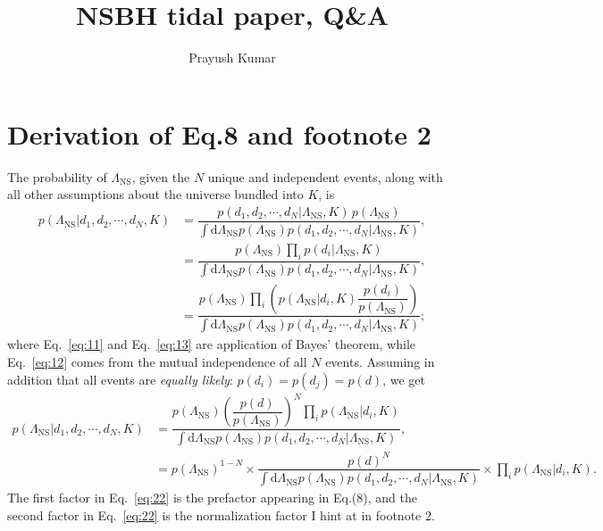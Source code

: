 \documentclass[aps,prd,amsmath,floats,floatfix,onecolumn,superscriptaddress,nofootinbib,showpacs]{revtex4-1}
\newcommand{\D}{\mathrm{d}}
\newcommand{\lambdans}{\Lambda_\mathrm{NS}}
\begin{document}
\title{NSBH tidal paper, Q\&A}
\author{Prayush Kumar}

\maketitle


\section{Derivation of Eq.8 and footnote 2}
The probability of $\lambdans$, given the $N$ unique and independent events,
along with all other assumptions about the universe bundled into $K$, is
\begin{eqnarray}
 p(\lambdans |d_1, d_2, \cdots, d_N, K) &= \dfrac{p(d_1,d_2,\cdots,d_N |\lambdans , K)\,p(\lambdans)}{\int\D\lambdans p(\lambdans ) p(d_1,d_2,\cdots,d_N |\lambdans , K)},\label{eq:11}\\
  &= \dfrac{p(\lambdans) \prod_{i} p(d_i|\lambdans, K)}{\int\D\lambdans p(\lambdans ) p(d_1,d_2,\cdots,d_N |\lambdans , K)},\label{eq:12}\\
  &= \dfrac{p(\lambdans) \prod_{i} \left( p(\lambdans |d_i, K)\dfrac{p(d_i)}{p(\lambdans)} \right)}{\int\D\lambdans p(\lambdans ) p(d_1,d_2,\cdots,d_N |\lambdans , K)}\label{eq:13};
\end{eqnarray}
where Eq.~\ref{eq:11} and Eq.~\ref{eq:13} are application of Bayes' theorem,
while Eq.~\ref{eq:12} comes from the mutual independence of all $N$ events. 
Assuming in addition that all events are {\it equally likely}: 
$p(d_i) = p(d_j) = p(d)$, we get
\begin{eqnarray}
 p(\lambdans |d_1, d_2, \cdots, d_N, K) &= \dfrac{p(\lambdans) \left(\dfrac{p(d)}{p(\lambdans)}\right)^N\prod_{i} p(\lambdans |d_i, K) }{\int\D\lambdans p(\lambdans ) p(d_1,d_2,\cdots,d_N |\lambdans , K)}\label{eq:21},\\
  &= p(\lambdans)^{1-N}\times \dfrac{p(d)^N}{\int\D\lambdans p(\lambdans) p(d_1, d_2, \cdots, d_N |\lambdans, K)} \times\prod_i p(\lambdans |d_i, K)\label{eq:22}.
\end{eqnarray}
The first factor in Eq.~\ref{eq:22} is the prefactor appearing in Eq.(8), and
the second factor in Eq.~\ref{eq:22} is the normalization factor I hint at
in footnote 2.
\end{document}
